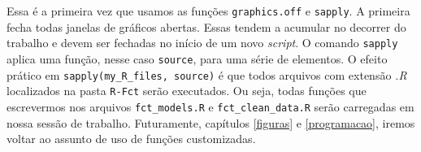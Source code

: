\documentclass[
  11pt,
]{book}
\newenvironment{Shaded}{\begin{snugshade}}{\end{snugshade}}
\newcommand{\AttributeTok}[1]{\textcolor[rgb]{0.61,0.61,0.61}{#1}}
\newcommand{\CommentTok}[1]{\textcolor[rgb]{0.37,0.37,0.37}{\textit{#1}}}
\newcommand{\ConstantTok}[1]{\textcolor[rgb]{0,0,0}{#1}}
\newcommand{\FunctionTok}[1]{\textcolor[rgb]{0,0,0}{#1}}
\newcommand{\NormalTok}[1]{#1}
\newcommand{\OtherTok}[1]{\textcolor[rgb]{0.37,0.37,0.37}{#1}}
\newcommand{\SpecialCharTok}[1]{\textcolor[rgb]{0,0,0}{#1}}
\newcommand{\StringTok}[1]{\textcolor[rgb]{0.5,0.5,0.5}{#1}}
\begin{document}
\begin{Shaded}
\end{Shaded}

Essa é a primeira vez que usamos as funções \texttt{graphics.off} e \texttt{sapply}. A primeira fecha todas janelas de gráficos abertas. Essas tendem a acumular no decorrer do trabalho e devem ser fechadas no início de um novo \emph{script}. O comando \texttt{sapply} aplica uma função, nesse caso \texttt{source}, para uma série de elementos. O efeito prático em \texttt{sapply(my\_R\_files,\ source)} é que todos arquivos com extensão \emph{.R} localizados na pasta \texttt{R-Fct} serão executados. Ou seja, todas funções que escrevermos nos arquivos \texttt{fct\_models.R} e \texttt{fct\_clean\_data.R} serão carregadas em nossa sessão de trabalho. Futuramente, capítulos \ref{figuras} e \ref{programacao}, iremos voltar ao assunto de uso de funções customizadas.
\end{document}
